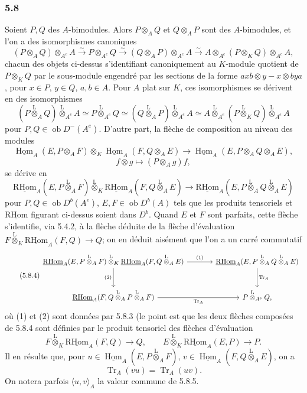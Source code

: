 \documentclass[11pt]{article}
\DeclareMathOperator{\Hom}{Hom}
\newcommand{\ob}{\operatorname{ob}}
\providecommand{\RHom}{\mathrm{RHom}}
\providecommand{\uRHom}{\underline{\RHom}}
\providecommand{\uHom}{\underline{\Hom}}
\providecommand{\Tr}{\operatorname{Tr}}
\providecommand{\Tr}{\operatorname{Tr}}
\providecommand{\lten}{\overset{\mathrm L}{\otimes}}
\providecommand{\Tr}{\operatorname{Tr}}
\providecommand{\RHom}{\mathrm{RHom}}
\providecommand{\Hom}{\operatorname{Hom}}
\providecommand{\ob}{\operatorname{ob}}
\providecommand{\lten}{\overset{\mathrm L}{\otimes}}
\providecommand{\RHom}{\mathrm R\mathcal{H}om}
\providecommand{\lten}{\overset{\mathrm L}{\otimes}}
\providecommand{\Tr}{\operatorname{Tr}}
\providecommand{\lten}{\overset{\mathrm L}{\otimes}}
\providecommand{\lten}{\overset{\mathrm L}{\otimes}}
\providecommand{\lten}{\overset{\mathrm L}{\otimes}}
\providecommand{\RHom}{\mathrm{RHom}}
\providecommand{\Hom}{\operatorname{Hom}}
\providecommand{\Tr}{\operatorname{Tr}}
\providecommand{\lten}{\overset{\mathrm L}{\otimes}}
\begin{document}
\subsubsection*{5.8}

Soient $P,Q$ des $A$-bimodules. Alors $P\otimes_AQ$ et $Q\otimes_AP$ sont des $A$-bimodules, et l'on a des isomorphismes canoniques
\begin{equation}\tag{5.8.1}
(P\otimes_AQ)\otimes_{A^e}A\xrightarrow{\sim}P\otimes_{A^e}Q\xrightarrow{\sim}(Q\otimes_AP)\otimes_{A^e}A\xrightarrow{\sim}A\otimes_{A^e}(P\otimes_KQ)\otimes_{A^e}A,
\end{equation}
chacun des objets ci-dessus s'identifiant canoniquement au $K$-module quotient de $P\otimes_KQ$ par le sous-module engendré par les sections de la forme $axb\otimes y-x\otimes bya$, pour $x\in P$, $y\in Q$, $a,b\in A$. Pour $A$ plat sur $K$, ces isomorphismes se dérivent en des isomorphismes
\begin{equation}\tag{5.8.2}
(P\lten_AQ)\lten_{A^e}A\simeq P\lten_{A^e}Q\simeq(Q\lten_AP)\lten_{A^e}A\simeq A\lten_{A^e}(P\lten_KQ)\lten_{A^e}A
\end{equation}
pour $P,Q\in\ob D^-(A^e)$. D'autre part, la flèche de composition au niveau des modules
\[
\uHom_A(E,P\otimes_AF)\otimes_K\uHom_A(F,Q\otimes_AE)
\longrightarrow\uHom_A(E,P\otimes_AQ\otimes_AE),
\]
\[
f\otimes g\longmapsto (P\otimes_Ag)f,
\]
se dérive en
\begin{equation}\tag{5.8.3}
\uRHom_A(E,P\lten_AF)\lten_K\uRHom_A(F,Q\lten_AE)
\longrightarrow\uRHom_A(E,P\lten_AQ\lten_AE)
\end{equation}
pour $P,Q\in\ob D^b(A^e)$, $E,F\in\ob D^b(A)$ tels que les produits tensoriels et $\uRHom$ figurant ci-dessus soient dans $D^b$. Quand $E$ et $F$ sont parfaits, cette flèche s'identifie, via 5.4.2, à la flèche déduite de la flèche d'évaluation $F\lten_K\uRHom_A(F,Q)\to Q$; on en déduit aisément que l'on a un carré commutatif
\begin{equation}\tag{5.8.4}
\begin{tikzcd}[column sep=large,row sep=large]
\uRHom_A(E,P\lten_AF)\lten_K\uRHom_A(F,Q\lten_AE) \arrow[r,"(1)"] \arrow[d,"(2)"'] & \uRHom_A(E,P\lten_AQ\lten_AE) \arrow[d,"\Tr_A"]\\
\uRHom_A(F,Q\lten_AP\lten_AF) \arrow[r,"\Tr_A"'] & P\lten_{A^e}Q,
\end{tikzcd}
\end{equation}
où (1) et (2) sont données par 5.8.3 (le point est que les deux flèches composées de 5.8.4 sont définies par le produit tensoriel des flèches d'évaluation
\[
F\lten_K\uRHom_A(F,Q)\longrightarrow Q,\qquad
E\lten_K\uRHom_A(E,P)\longrightarrow P.
\]
Il en résulte que, pour $u\in\uHom_A(E,P\lten_AF)$, $v\in\uHom_A(F,Q\lten_AE)$, on a
\begin{equation}\tag{5.8.5}
\Tr_A(vu)=\Tr_A(uv).
\end{equation}
On notera parfois $\langle u,v\rangle_A$ la valeur commune de 5.8.5.
\end{document}
